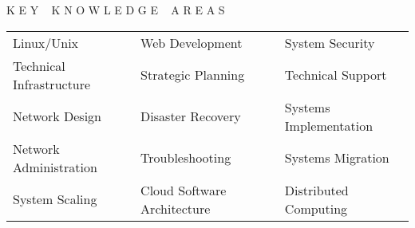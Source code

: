  

\begin{rubric}{K E Y ~ K N O W L E D G E ~ A R E A S}
	\begin{tabular}{|p{2in}|p{2in}|p{2in}|}
		Linux/Unix & Web Development & System Security\\
		Technical Infrastructure & Strategic Planning & Technical Support\\
		Network Design & Disaster Recovery & Systems Implementation\\
		Network Administration & Troubleshooting & Systems Migration\\
        System Scaling & Cloud Software Architecture & Distributed Computing 
	\end{tabular}
\end{rubric}

